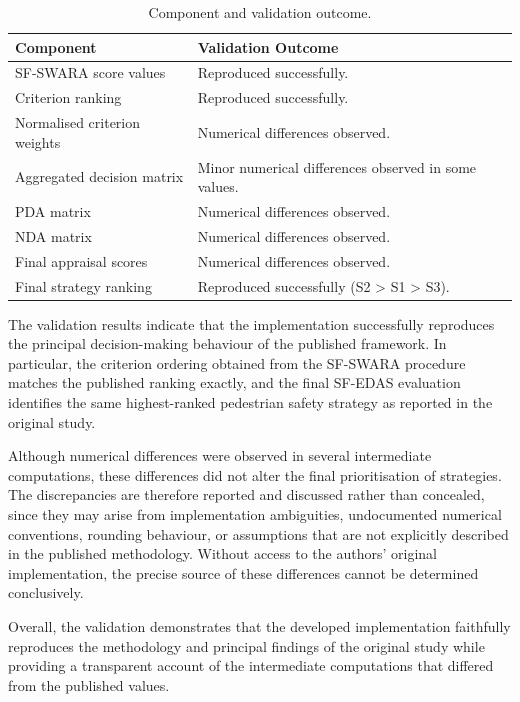 \documentclass[11pt]{article}
\begin{document}
\begin{table}[h]
    \centering
    \begin{tabular}{ll}
        \toprule
        \textbf{Component} & \textbf{Validation Outcome} \\
        \midrule
        SF-SWARA score values & Reproduced successfully. \\
        Criterion ranking & Reproduced successfully. \\
        Normalised criterion weights & Numerical differences observed. \\
        Aggregated decision matrix & Minor numerical differences observed in some values. \\
        PDA matrix & Numerical differences observed. \\
        NDA matrix & Numerical differences observed. \\
        Final appraisal scores & Numerical differences observed. \\
        Final strategy ranking & Reproduced successfully (S2 > S1 > S3). \\
        \bottomrule
    \end{tabular}
    \caption{Component and validation outcome.}
    \label{tab:validation}
\end{table}

The validation results indicate that the implementation successfully reproduces the principal decision-making behaviour of the published framework. In particular, the criterion ordering obtained from the SF-SWARA procedure matches the published ranking exactly, and the final SF-EDAS evaluation identifies the same highest-ranked pedestrian safety strategy as reported in the original study.

Although numerical differences were observed in several intermediate computations, these differences did not alter the final prioritisation of strategies. The discrepancies are therefore reported and discussed rather than concealed, since they may arise from implementation ambiguities, undocumented numerical conventions, rounding behaviour, or assumptions that are not explicitly described in the published methodology. Without access to the authors' original implementation, the precise source of these differences cannot be determined conclusively.

Overall, the validation demonstrates that the developed implementation faithfully reproduces the methodology and principal findings of the original study while providing a transparent account of the intermediate computations that differed from the published values.
\end{document}

